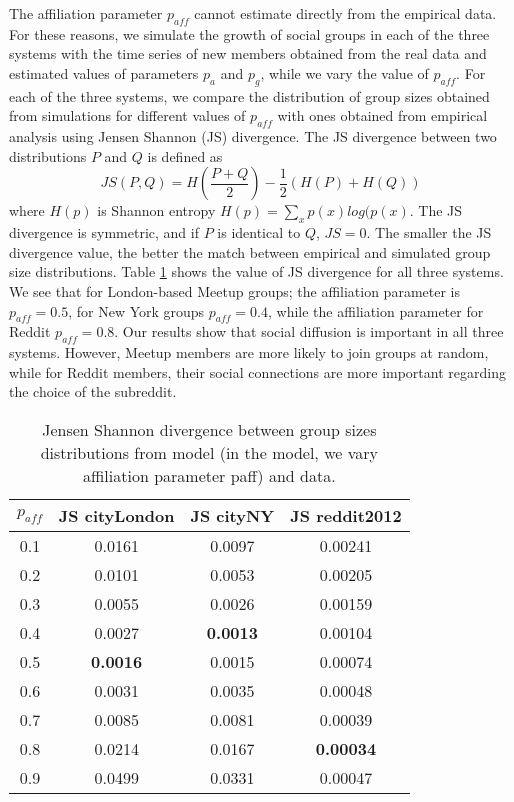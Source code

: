 The affiliation parameter $p_{aff}$ cannot estimate directly from the empirical data. For these reasons, we simulate the growth of social groups in each of the three systems with the time series of new members obtained from the real data and estimated values of parameters $p_a$ and $p_g$, while we vary the value of $p_{aff}$. For each of the three systems, we compare the distribution of group sizes obtained from simulations for different values of $p_{aff}$ with ones obtained from empirical analysis using Jensen Shannon (JS) divergence. The JS divergence \cite{jsdivergence} between two distributions $P$ and $Q$ is defined as 
\begin{equation}
JS(P, Q) = H\left(\frac{P+Q}{2}\right) - \frac{1}{2}\left(H(P)+H(Q)\right) \label{eq2}
\end{equation}
where $H(p)$ is Shannon entropy $H(p)=\sum_x p(x)log(p(x)$. The JS divergence is symmetric, and if $P$ is identical to $Q$, $JS=0$. The smaller the JS divergence value, the better the match between empirical and simulated group size distributions. Table \ref{tab:table} shows the value of JS divergence for all three systems. We see that for London-based Meetup groups; the affiliation parameter is $p_{aff}=0.5$, for New York groups $p_{aff}=0.4$, while the affiliation parameter for Reddit $p_{aff}=0.8$. Our results show that social diffusion is important in all three systems. However, Meetup members are more likely to join groups at random, while for Reddit members, their social connections are more important regarding the choice of the subreddit.  


\begin{table}[h]
	\centering
	\begin{tabular}{|c|c|c|c|}
		\hline
		$p_{aff}$ & JS cityLondon   & JS cityNY       & JS reddit2012    \\ \hline
		0.1  & 0.0161          & 0.0097          & 0.00241          \\ \hline
		0.2  & 0.0101          & 0.0053          & 0.00205          \\ \hline
		0.3  & 0.0055          & 0.0026          & 0.00159          \\ \hline
		0.4  & 0.0027          & \textbf{0.0013} & 0.00104          \\ \hline
		0.5  & \textbf{0.0016} & 0.0015          & 0.00074          \\ \hline
		0.6  & 0.0031          & 0.0035          & 0.00048          \\ \hline
		0.7  & 0.0085          & 0.0081          & 0.00039          \\ \hline
		0.8  & 0.0214          & 0.0167          & \textbf{0.00034} \\ \hline
		0.9  & 0.0499          & 0.0331          & 0.00047          \\ \hline
	\end{tabular}
	\caption[Jensen Shannon divergence between group sizes distributions from model and data.]{Jensen Shannon divergence between group sizes distributions from model
		(in the model, we vary affiliation parameter paff) and data.}
	\label{tab:table}
\end{table}


